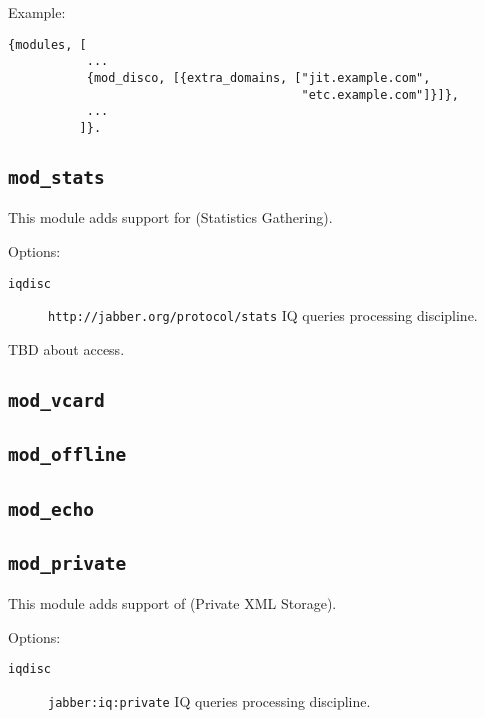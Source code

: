 \documentclass[10pt]{article}
\newcommand{\ns}[1]{\texttt{#1}}
\newcommand{\modstats}{\texttt{mod\_stats}}
\newcommand{\modvcard}{\texttt{mod\_vcard}}
\newcommand{\modoffline}{\texttt{mod\_offline}}
\newcommand{\modecho}{\texttt{mod\_echo}}
\newcommand{\modprivate}{\texttt{mod\_private}}
\begin{document}
Example:
\begin{verbatim}
{modules, [
           ...
           {mod_disco, [{extra_domains, ["jit.example.com",
                                         "etc.example.com"]}]},
           ...
          ]}.
\end{verbatim}


\subsection{\modstats{}}
\label{sec:modstats}

This module adds support for
 (Statistics
Gathering).

Options:
\begin{description}
\item[\texttt{iqdisc}] \ns{http://jabber.org/protocol/stats} IQ queries
  processing discipline.
\end{description}

TBD about access.

\subsection{\modvcard{}}
\label{sec:modvcard}



\subsection{\modoffline{}}
\label{sec:modoffline}



\subsection{\modecho{}}
\label{sec:modecho}



\subsection{\modprivate{}}
\label{sec:modprivate}

This module adds support of
 (Private XML
Storage).

Options:
\begin{description}
\item[\texttt{iqdisc}] \ns{jabber:iq:private} IQ queries processing discipline.
\end{description}
\end{document}

